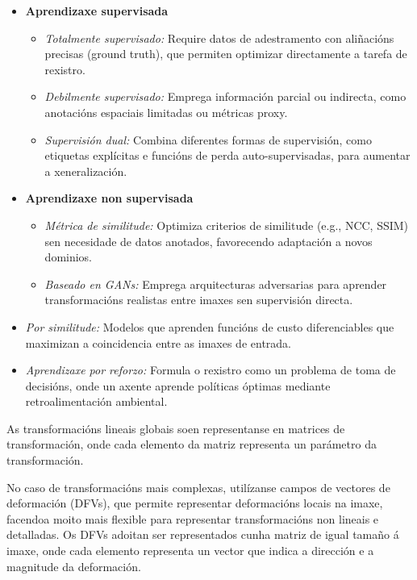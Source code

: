 \begin{itemize}
\begin{itemize}
\begin{itemize}
            \item \textbf{Aprendizaxe supervisada}
            \begin{itemize}
                \item \textit{Totalmente supervisado:} Require datos de adestramento con aliñacións precisas (ground truth), que permiten optimizar directamente a tarefa de rexistro.
                \item \textit{Debilmente supervisado:} Emprega información parcial ou indirecta, como anotacións espaciais limitadas ou métricas proxy.
                \item \textit{Supervisión dual:} Combina diferentes formas de supervisión, como etiquetas explícitas e funcións de perda auto-supervisadas, para aumentar a xeneralización.
            \end{itemize}
            
            \item \textbf{Aprendizaxe non supervisada}
            \begin{itemize}
                \item \textit{Métrica de similitude:} Optimiza criterios de similitude (e.g., NCC, SSIM) sen necesidade de datos anotados, favorecendo adaptación a novos dominios.
                \item \textit{Baseado en GANs:} Emprega arquitecturas adversarias para aprender transformacións realistas entre imaxes sen supervisión directa.
            \end{itemize}
            
            \item \textit{Por similitude:} Modelos que aprenden funcións de custo diferenciables que maximizan a coincidencia entre as imaxes de entrada.
            \item \textit{Aprendizaxe por reforzo:} Formula o rexistro como un problema de toma de decisións, onde un axente aprende políticas óptimas mediante retroalimentación ambiental.
        \end{itemize}
    \end{itemize}
\end{itemize}

As transformacións lineais globais soen representanse en matrices de transformación, onde cada elemento da matriz representa un parámetro da transformación.

No caso de transformacións mais complexas, utilízanse campos de vectores de deformación (\gls{DFV}s), que permite representar deformacións locais na imaxe, facendoa moito mais flexible para representar transformacións non lineais e detalladas.
Os DFVs adoitan ser representados cunha matriz de igual tamaño á imaxe, onde cada elemento representa un vector que indica a dirección e a magnitude da deformación.


